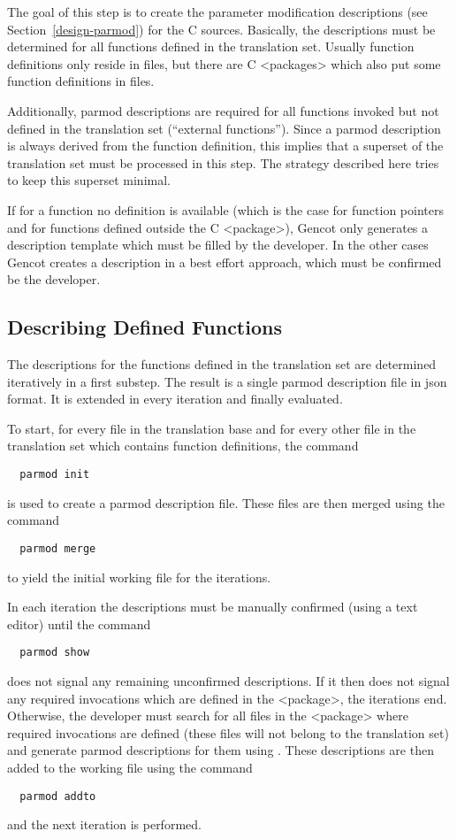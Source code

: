 The goal of this step is to create the parameter modification descriptions (see Section~\ref{design-parmod})
for the C sources. Basically, the descriptions must be determined for all functions defined in the translation
set. Usually function definitions only reside in  files, but there are C <packages> which also put 
some function definitions in  files.

Additionally, parmod descriptions are required for all functions invoked but not defined in
the translation set (``external functions''). Since a parmod description is always derived from the function 
definition, this implies that a superset of the translation set must be processed in this step. The strategy 
described here tries to keep this superset minimal. 

If for a function no definition is available (which is the case for function pointers and for functions
defined outside the C <package>), Gencot only generates a description template which must be filled by the
developer. In the other cases Gencot creates a description in a best effort approach, which must be confirmed
be the developer.

\subsection{Describing Defined Functions}
\label{app-parmod-defined}

The descriptions for the functions defined in the translation set are determined iteratively in a first substep. 
The result is a single parmod description file in json format. It is extended in every iteration and finally
evaluated.

To start, for every file in the translation base and for every other file in the translation set which contains
function definitions, the command
\begin{verbatim}
  parmod init
\end{verbatim}
is used to create a parmod description file. These files are then merged using the command
\begin{verbatim}
  parmod merge
\end{verbatim}
to yield the initial working file for the iterations. 

In each iteration the descriptions must be manually confirmed (using a text editor) until the command
\begin{verbatim}
  parmod show
\end{verbatim}
does not signal any remaining unconfirmed descriptions. If it then does not signal any required 
invocations which are defined in the <package>, the iterations end. Otherwise, the developer must
search for all files in the <package> where required invocations are defined (these files will
not belong to the translation set) and generate parmod descriptions for them using .
These descriptions are then added to the working file using the command
\begin{verbatim}
  parmod addto
\end{verbatim}
and the next iteration is performed.

